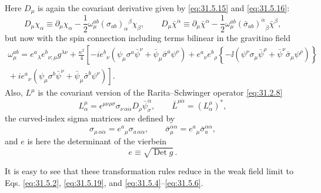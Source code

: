 Here \(D_\mu\) is again the covariant derivative given by
\eqref{eq:31.5.15} and \eqref{eq:31.5.16}:
\begin{equation}
  D_\mu\chi_\alpha\equiv
  \partial_\mu\chi_\alpha
  -\frac12\omega_\mu^{ab}(\sigma_{ab})_\alpha{}^\beta\chi_\beta,
  \qquad
  D_\mu\bar\chi^{\dot\alpha}\equiv
  \partial_\mu\bar\chi^{\dot\alpha}
  -\frac12\omega_\mu^{ab}
   (\bar\sigma_{ab})^{\dot\alpha}{}_{\dot\beta}
   \bar\chi^{\dot\beta},
  \tag{31.6.6}\label{eq:31.6.6}
\end{equation}
but now with the spin connection including terms bilinear in the
gravitino field
\begin{multline}
  \omega_\mu^{ab}
  =e^a{}_\lambda e^b{}_{\nu;\mu}g^{\lambda\nu}
  +\frac{\kappa^2}{4}\left[
    -ie^b{}_\nu\left(
      \psi_\mu\sigma^a\bar\psi^\nu
      +\bar\psi_\mu\bar\sigma^a\psi^\nu\right)
    +e^a{}_\nu e^b{}_\rho
      \left\{-\ii\left(
        \psi^\nu\sigma_\mu\bar\psi^\rho
        +\bar\psi^\nu\bar\sigma_\mu\psi^\rho
      \right)\right\}\right.\\
  \left.
    {}+ie^a{}_\nu\left(
      \psi_\mu\sigma^b\bar\psi^\nu
      +\bar\psi_\mu\bar\sigma^b\psi^\nu\right)
  \right].
  \tag{31.6.7}\label{eq:31.6.7}
\end{multline}
Also, \(L^\mu\) is the covariant version of the Rarita--Schwinger
operator \eqref{eq:31.2.8}
\begin{equation}
  L^\mu_\alpha
  =\epsilon^{\mu\nu\rho\sigma}
    \sigma_{\nu\,\alpha\dot\alpha}
    D_\rho\bar\psi_\sigma^{\dot\alpha},
  \qquad
  \bar L^{\mu\dot\alpha}=(L^\mu_\alpha)^*,
  \tag{31.6.8}\label{eq:31.6.8}
\end{equation}
the curved-index sigma matrices are defined by
\begin{equation}
  \sigma_{\mu\,\alpha\dot\alpha}
  =e^a{}_\mu\sigma_{a\,\alpha\dot\alpha},
  \qquad
  \bar\sigma_\mu^{\dot\alpha\alpha}
  =e^a{}_\mu\bar\sigma_a^{\dot\alpha\alpha},
  \tag{31.6.9}\label{eq:31.6.9}
\end{equation}
and \(e\) is here the determinant of the vierbein
\begin{equation}
  e\equiv\sqrt{\operatorname{Det}g}\,.
  \tag{31.6.10}\label{eq:31.6.10}
\end{equation}

It is easy to see that these transformation rules reduce in the weak
field limit to Eqs. \eqref{eq:31.5.2}, \eqref{eq:31.5.19}, and
\eqref{eq:31.5.4}--\eqref{eq:31.5.6}.

